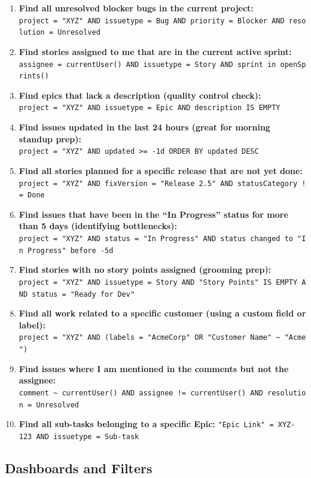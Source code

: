 \documentclass[
  11pt,
  openany,
  oneside]{book}
\begin{document}
\begin{enumerate}
\def\labelenumi{\arabic{enumi}.}
\item
  \textbf{Find all unresolved blocker bugs in the current project:}
  \texttt{project\ =\ "XYZ"\ AND\ issuetype\ =\ Bug\ AND\ priority\ =\ Blocker\ AND\ resolution\ =\ Unresolved}
\item
  \textbf{Find stories assigned to me that are in the current active
  sprint:}
  \texttt{assignee\ =\ currentUser()\ AND\ issuetype\ =\ Story\ AND\ sprint\ in\ openSprints()}
\item
  \textbf{Find epics that lack a description (quality control check):}
  \texttt{project\ =\ "XYZ"\ AND\ issuetype\ =\ Epic\ AND\ description\ IS\ EMPTY}
\item
  \textbf{Find issues updated in the last 24 hours (great for morning
  standup prep):}
  \texttt{project\ =\ "XYZ"\ AND\ updated\ \textgreater{}=\ -1d\ ORDER\ BY\ updated\ DESC}
\item
  \textbf{Find all stories planned for a specific release that are not
  yet done:}
  \texttt{project\ =\ "XYZ"\ AND\ fixVersion\ =\ "Release\ 2.5"\ AND\ statusCategory\ !=\ Done}
\item
  \textbf{Find issues that have been in the ``In Progress'' status for
  more than 5 days (identifying bottlenecks):}
  \texttt{project\ =\ "XYZ"\ AND\ status\ =\ "In\ Progress"\ AND\ status\ changed\ to\ "In\ Progress"\ before\ -5d}
\item
  \textbf{Find stories with no story points assigned (grooming prep):}
  \texttt{project\ =\ "XYZ"\ AND\ issuetype\ =\ Story\ AND\ "Story\ Points"\ IS\ EMPTY\ AND\ status\ =\ "Ready\ for\ Dev"}
\item
  \textbf{Find all work related to a specific customer (using a custom
  field or label):}
  \texttt{project\ =\ "XYZ"\ AND\ (labels\ =\ "AcmeCorp"\ OR\ "Customer\ Name"\ \textasciitilde{}\ "Acme")}
\item
  \textbf{Find issues where I am mentioned in the comments but not the
  assignee:}
  \texttt{comment\ \textasciitilde{}\ currentUser()\ AND\ assignee\ !=\ currentUser()\ AND\ resolution\ =\ Unresolved}
\item
  \textbf{Find all sub-tasks belonging to a specific Epic:}
  \texttt{"Epic\ Link"\ =\ XYZ-123\ AND\ issuetype\ =\ Sub-task}
\end{enumerate}

\subsection{Dashboards and Filters}\label{dashboards-and-filters}
\end{document}
